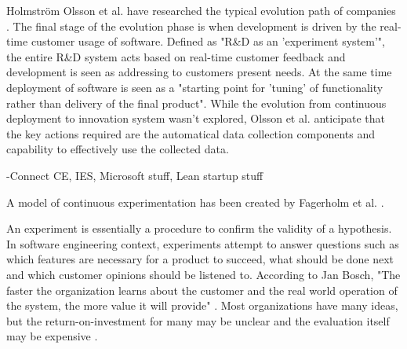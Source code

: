 \documentclass[english]{tktltiki2}
\theoremstyle{definition}
\theoremstyle{remark}
\begin{document}
Holmström Olsson et al. have researched the typical evolution path of companies \cite{olsson2012climbing}. The final stage of the evolution phase is when development is driven by the real-time customer usage of software. Defined as "R&D as an 'experiment system'", the entire R&D system acts based on real-time customer feedback and development is seen as addressing to customers present needs. At the same time deployment of software is seen as a "starting point for 'tuning' of functionality rather than delivery of the final product". While the evolution from continuous deployment to innovation system wasn't explored, Olsson et al. anticipate that the key actions required are the automatical data collection components and capability to effectively use the collected data.

-Connect CE, IES, Microsoft stuff, Lean startup stuff


A model of continuous experimentation has been created by Fagerholm et al. \cite{fagerholm2014building}. 

An experiment is essentially a procedure to confirm the validity of a hypothesis. In software engineering context, experiments attempt to answer questions such as which features are necessary for a product to succeed, what should be done next and which customer opinions should be listened to. According to Jan Bosch, "The faster the organization learns about the customer and the real world operation of the system, the more value it will provide" \cite{bosch2012building}. Most organizations have many ideas, but the return-on-investment for many may be unclear and the evaluation itself may be expensive \cite{kohavi2007practical}. 
\end{document}
